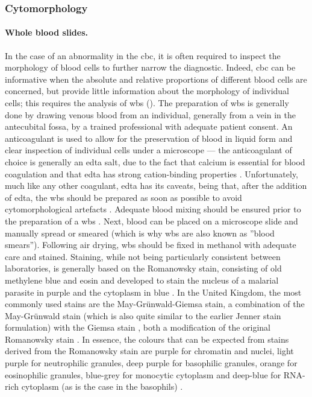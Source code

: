 \subsubsection{Cytomorphology}

\paragraph{Whole blood slides.} In the case of an abnormality in the \ac{cbc}, it is often required to inspect the morphology of blood cells to further narrow the diagnostic. Indeed, \ac{cbc} can be informative when the absolute and relative proportions of different blood cells are concerned, but provide little information about the morphology of individual cells; this requires the analysis of \ac{wbs} (). The preparation of \ac{wbs} is generally done by drawing venous blood from an individual, generally from a vein in the antecubital fossa, by a trained professional with adequate patient consent. An anticoagulant is used to allow for the preservation of blood in liquid form and clear inspection of individual cells under a microscope --- the anticoagulant of choice is generally an \ac{edta} salt, due to the fact that calcium is essential for blood coagulation and that \ac{edta} has strong cation-binding properties \cite{Oh2007-yr}. Unfortunately, much like any other coagulant, \ac{edta} has its caveats, being that, after the addition of \ac{edta}, the \ac{wbs} should be prepared as soon as possible to avoid cytomorphological artefacts \cite{Oh2007-yr,Bain2014-oc}. Adequate blood mixing should be ensured prior to the preparation of a \ac{wbs} \cite{Ashenden2012-eu}. Next, blood can be placed on a microscope slide and manually spread or smeared (which is why \ac{wbs} are also known as ”blood smears”). Following air drying, \ac{wbs} should be fixed in methanol with adequate care \cite{Bain2014-oc} and stained. Staining, while not being particularly consistent between laboratories, is generally based on the Romanowsky stain, consisting of old methylene blue and eosin and developed to stain the nucleus of a malarial parasite in purple and the cytoplasm in blue \cite{England1976-ff}. In the United Kingdom, the most commonly used stains are the May-Grünwald-Giemsa stain, a combination of the May-Grünwald stain (which is also quite similar to the earlier Jenner stain formulation) \cite{Krafts2011-xh} with the Giemsa stain \cite{Giemsa1904-dm}, both a modification of the original Romanowsky stain \cite{Bain2014-oc}. In essence, the colours that can be expected from stains derived from the Romanowsky stain are purple for chromatin and nuclei, light purple for neutrophilic granules, deep purple for basophilic granules, orange for eosinophilic granules, blue-grey for monocytic cytoplasm and deep-blue for RNA-rich cytoplasm (as is the case in the basophils) \cite{Bain2014-oc}.

